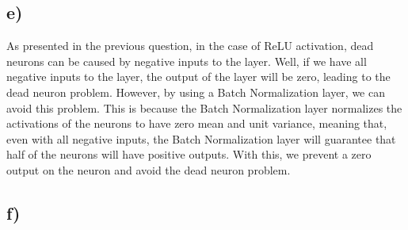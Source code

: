 \documentclass{article}
\begin{document}
\subsection*{e)}

As presented in the previous question, in the case of ReLU activation, dead neurons can be caused by negative inputs to
the layer. Well, if we have all negative inputs to the layer, the output of the layer will be zero, leading
to the dead neuron problem. However, by using a Batch Normalization layer, we can avoid this problem. This is because
the Batch Normalization layer normalizes the activations of the neurons to have zero mean and unit variance, meaning
that, even with all negative inputs, the Batch Normalization layer will guarantee that half of the neurons will have
positive outputs. With this, we prevent a zero output on the neuron and avoid the dead neuron problem.

\newpage
\subsection*{f)}
\end{document}
